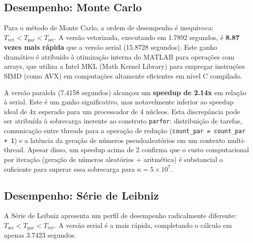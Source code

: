 \documentclass[12pt, a4paper]{article}
\begin{document}
	\subsection{Desempenho: Monte Carlo}
	
	Para o método de Monte Carlo, a ordem de desempenho é inequívoca:
	\(T_{\text{vet}} < T_{\text{par}} < T_{\text{ser}}\). A versão vetorizada,
	executando em 1.7892 segundos, é \textbf{8.87 vezes mais rápida} que a versão
	serial (15.8728 segundos). Este ganho dramático é atribuído à otimização interna
	do MATLAB para operações com arrays, que utiliza a Intel MKL (Math Kernel Library)
	para empregar instruções SIMD (como AVX) em computações altamente eficientes em
	nível C compilado.
	
	A versão paralela (7.4158 segundos) alcançou um \textbf{speedup de 2.14x} em
	relação à serial. Este é um ganho significativo, mas notavelmente inferior ao
	speedup ideal de 4x esperado para um processador de 4 núcleos. Esta discrepância
	pode ser atribuída à sobrecarga inerente ao construto \texttt{parfor}: distribuição
	de tarefas, comunicação entre threads para a operação de redução
	(\texttt{count\_par = count\_par + 1}) e a latência da geração de números
	pseudoaleatórios em um contexto multi-thread. Apesar disso, um speedup acima de
	2 confirma que o custo computacional por iteração (geração de números aleatórios
	+ aritmética) é substancial o suficiente para superar essa sobrecarga para
	\(n = 5\times10^7\).
	
	\subsection{Desempenho: Série de Leibniz}
	
	A Série de Leibniz apresenta um perfil de desempenho radicalmente diferente:
	\(T_{\text{ser}} < T_{\text{par}} < T_{\text{vet}}\). A versão serial é a mais
	rápida, completando o cálculo em apenas 3.7423 segundos.
	
\end{document}
